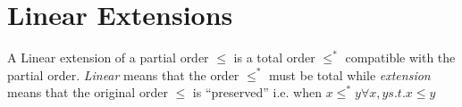 \section{Linear Extensions}

A Linear extension of a partial order $\leq$ is a total order $\leq^*$ compatible with the partial order. \emph{Linear} means that the order $\leq^*$ must be total while \emph{extension} means that the original order $\leq$ is ``preserved'' i.e. when $x \leq^* y \forall x, y s.t. x \leq y$ 